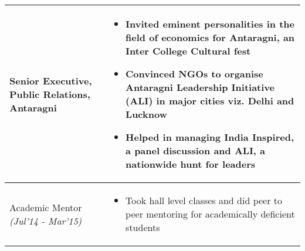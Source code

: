 \documentclass{article}
\begin{document}
\begin{tabular}{|P{3cm}|P{15.4cm}|}
\hline
\vspace{0.1cm}Senior Executive, Public Relations, Antaragni & \vspace{-0.4cm}\begin{itemize}[leftmargin=0.3cm]
\setlength\itemsep{0.2pt}
\item Invited eminent personalities in the field of economics for Antaragni, an Inter College Cultural fest
\item Convinced NGOs to organise Antaragni Leadership Initiative (ALI) in major cities viz. Delhi and Lucknow
\item Helped in managing India Inspired, a panel discussion and ALI, a nationwide hunt for leaders

\end{itemize}\\
\hline
\vspace{-0.09cm}Academic Mentor {\emph{(Jul'14 - Mar'15)}} & \vspace{-0.4cm}\begin{itemize}[leftmargin=0.3cm]
\setlength\itemsep{0.2pt}
\item Took hall level classes and did peer to peer mentoring for academically deficient students
\end{itemize}\\
\hline
\end{tabular}\vspace{0.2cm}
\end{document}
